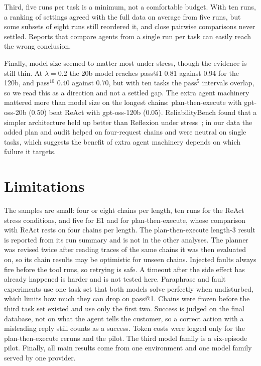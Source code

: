 \documentclass[10pt,a4paper,twocolumn]{article}
\newcommand{\passk}[1]{\mathrm{pass}^{#1}}
\begin{document}
Third, five runs per task is a minimum, not a comfortable budget. With ten runs, a ranking of settings agreed with the
full data on average from five runs, but some subsets of eight runs still reordered it, and close pairwise comparisons
never settled. Reports that compare agents from a single run per task can easily reach the wrong conclusion.

Finally, model size seemed to matter most under stress, though the evidence is still thin. At $\lambda=0.2$ the 20b
model reaches pass@1 0.81 against 0.94 for the 120b, and $\passk{10}$ 0.40 against 0.70, but with ten tasks the
$\passk{5}$ intervals overlap, so we read this as a direction and not a settled gap. The extra agent machinery mattered
more than model size on the longest chains: plan-then-execute with gpt-oss-20b (0.50) beat ReAct with gpt-oss-120b
(0.05). ReliabilityBench found that a simpler architecture held up better than Reflexion under stress~\cite{reliabilitybench};
in our data the added plan and audit helped on four-request chains and were neutral on single tasks, which suggests the
benefit of extra agent machinery depends on which failure it targets.

\section{Limitations}
The samples are small: four or eight chains per length, ten runs for the ReAct stress conditions, and five for E1 and
for plan-then-execute, whose comparison with ReAct rests on four chains per length. The plan-then-execute length-3 result
is reported from its run summary and is not in the other analyses. The planner was revised twice after reading traces
of the same chains it was then evaluated on, so its chain results may be optimistic for unseen chains. Injected faults
always fire before the tool runs, so retrying is safe. A timeout after the side effect has already happened is harder and
is not tested here. Paraphrase and fault experiments use one task set that both models solve perfectly when undisturbed,
which limits how much they can drop on pass@1. Chains were frozen before the third task set existed and use only the first
two. Success is judged on the final database, not on what the agent tells the customer, so a correct action with a
misleading reply still counts as a success. Token costs were logged only for the plan-then-execute reruns and the pilot.
The third model family is a six-episode pilot. Finally, all main results come from one environment and one model family
served by one provider.
\end{document}

